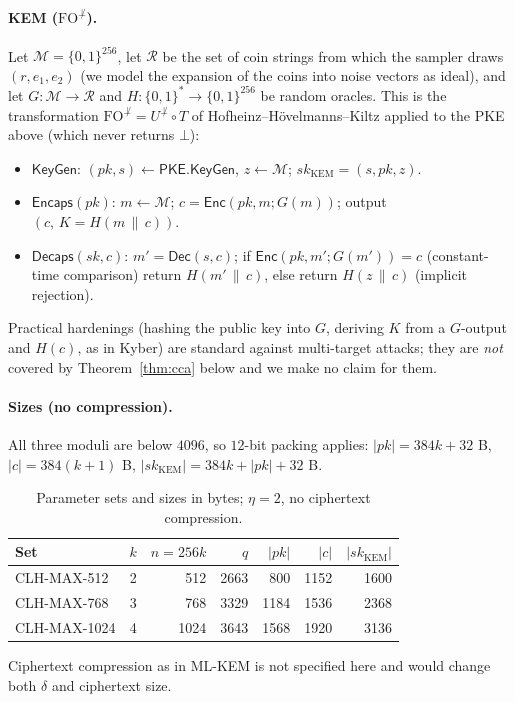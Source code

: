 \documentclass[11pt]{article}
\theoremstyle{remark}
\begin{document}
\paragraph{KEM ($\mathrm{FO}^{\not\perp}$).} Let $\mathcal M=\{0,1\}^{256}$, let $\mathcal R$ be the set of coin strings from which the sampler draws $(r,e_1,e_2)$ (we model the expansion of the coins into noise vectors as ideal), and let $G:\mathcal M\to\mathcal R$ and $H:\{0,1\}^{*}\to\{0,1\}^{256}$ be random oracles. This is the transformation $\mathrm{FO}^{\not\perp}=U^{\not\perp}\circ T$ of Hofheinz--H\"ovelmanns--Kiltz \cite{HHK17} applied to the PKE above (which never returns $\bot$):
\begin{itemize}[nosep]
\item $\mathsf{KeyGen}$: $(pk,s)\leftarrow\mathsf{PKE.KeyGen}$, $z\leftarrow\mathcal M$; $sk_{\mathrm{KEM}}=(s,pk,z)$.
\item $\mathsf{Encaps}(pk)$: $m\leftarrow\mathcal M$; $c=\mathsf{Enc}(pk,m;G(m))$; output $(c,\,K=H(m\,\|\,c))$.
\item $\mathsf{Decaps}(sk,c)$: $m'=\mathsf{Dec}(s,c)$; if $\mathsf{Enc}(pk,m';G(m'))=c$ (constant-time comparison) return $H(m'\,\|\,c)$, else return $H(z\,\|\,c)$ (implicit rejection).
\end{itemize}
Practical hardenings (hashing the public key into $G$, deriving $K$ from a $G$-output and $H(c)$, as in Kyber) are standard against multi-target attacks; they are \emph{not} covered by Theorem~\ref{thm:cca} below and we make no claim for them.

\paragraph{Sizes (no compression).} All three moduli are below $4096$, so $12$-bit packing applies: $|pk|=384k+32$ B, $|c|=384(k+1)$ B, $|sk_{\mathrm{KEM}}|=384k+|pk|+32$ B.
\begin{table}[h]\centering
\begin{tabular}{lrrrrrr}\toprule
Set & $k$ & $n=256k$ & $q$ & $|pk|$ & $|c|$ & $|sk_{\mathrm{KEM}}|$\\\midrule
CLH-MAX-512 & 2 & 512 & 2663 & 800 & 1152 & 1600\\
CLH-MAX-768 & 3 & 768 & 3329 & 1184 & 1536 & 2368\\
CLH-MAX-1024 & 4 & 1024 & 3643 & 1568 & 1920 & 3136\\\bottomrule
\end{tabular}
\caption{Parameter sets and sizes in bytes; $\eta=2$, no ciphertext compression.}\label{tab:params}
\end{table}
Ciphertext compression as in ML-KEM is not specified here and would change both $\delta$ and ciphertext size.
\end{document}
